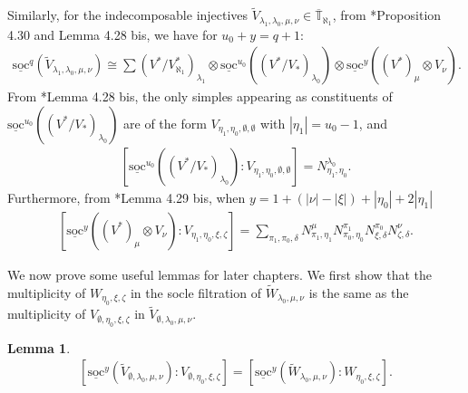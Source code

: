 \documentclass[openany, a4paper]{amsbook}
\newtheorem{lem}[thm]{Lemma}
\theoremstyle{definition}
\numberwithin{equation}{chapter}
\newcommand{\Tbar}[1]{\overline{\mathbb{T}}_{\aleph_{#1}}}
\newcommand{\socl}[2]{\underline{\mathrm{soc}}^{#1}({#2})}
\begin{document}
Similarly, for the indecomposable injectives $\tilde{V}_{\lambda_1, \lambda_0, \mu, \nu} \in \Tbar{1}$, from \cite{cp17}*{Proposition 4.30 and Lemma 4.28 bis}, we have for $u_0 + y = q+1$:
\begin{align}\label{30 V}
    \socl{q}{\tilde{V}_{\lambda_1, \lambda_0, \mu, \nu}} \cong \sum  (V^\ast/V^{\ast}_{\aleph_1})_{\lambda_1} \otimes \socl{u_0}{(V^\ast/V_\ast)_{\lambda_0}} \otimes \socl{y}{ (V^*)_\mu \otimes V_\nu}.
\end{align}
From \cite{cp17}*{Lemma 4.28 bis}, the only simples appearing as constituents of $\socl{u_0}{(V^\ast/V_\ast)_{\lambda_0}}$ are of the form $V_{\eta_1, \eta_0, \emptyset, \emptyset }$ with $\left\lvert \eta_1 \right\rvert = u_0 - 1$, and
\begin{align}\label{28 V 0}
    \left[ \socl{u_0}{(V^\ast/V_\ast)_{\lambda_0}} \colon V_{\eta_1, \eta_0, \emptyset, \emptyset }  \right] =  N^{\lambda_0}_{\eta_1, \eta_0}.
\end{align}
Furthermore, from \cite{cp17}*{Lemma 4.29 bis}, when $y = 1 + (\left\lvert \nu \right\rvert - \left\lvert \xi \right\rvert ) + \left\lvert \eta_0 \right\rvert + 2\left\lvert \eta_1 \right\rvert$ 
\begin{align}\label{29 V}
    \left[ \socl{y}{(V^\ast)_\mu \otimes V_\nu } \colon V_{\eta_1, \eta_0, \xi, \zeta }  \right] = \sum_{\pi_1,\pi_0, \delta} N^{\mu}_{\pi_1, \eta_1} N^{\pi_1}_{\pi_0, \eta_0} N^{\pi_0}_{\xi, \delta} N^{\nu}_{\zeta, \delta}.
\end{align}

We now prove some useful lemmas for later chapters. We first show that the multiplicity of $W_{\eta_0, \xi, \zeta }$ in the socle filtration of $\tilde{W}_{\lambda_0, \mu, \nu}$ is the same as the multiplicity of $V_{\emptyset, \eta_0, \xi, \zeta }$ in $\tilde{V}_{\emptyset, \lambda_0, \mu, \nu}$.

\begin{lem}\label{socle 1}
    \begin{align}
        \left[ \socl{y}{\tilde{V}_{\emptyset, \lambda_0, \mu, \nu}} \colon V_{\emptyset, \eta_0, \xi, \zeta }  \right] = 
        \left[ \socl{y}{\tilde{W}_{\lambda_0, \mu, \nu}} \colon W_{\eta_0, \xi, \zeta }  \right].
    \end{align}
\end{lem}
\end{document}
